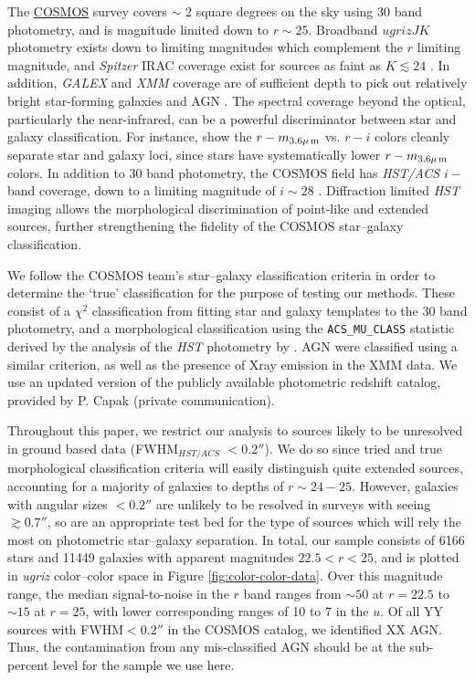\documentclass[12pt,preprint]{aastex}
\begin{document}
The \href{http://cosmos.astro.caltech.edu/}{COSMOS} survey \citep{scoville07a} covers $\sim$ 2 square degrees on
the sky using 30 band photometry, and is magnitude limited down to $r
\sim 25$.  Broadband $ugrizJK$ photometry exists down to limiting
magnitudes which complement the $r$ limiting magnitude, and {\it
  Spitzer} IRAC coverage exist for sources as faint as $K\lesssim24$ 
  \citep{capak07,sanders07,taniguchi07}.
In addition, {\it GALEX} and {\it XMM} coverage are of sufficient
depth to pick out relatively bright star-forming galaxies and AGN 
\citep{hasinger07,zamojski07}.
The spectral coverage beyond the optical, particularly the
near-infrared, can be a powerful discriminator between star and
galaxy classification.  For instance, \citet{ilbert09} show the
$r-m_{\rm 3.6\mu\,m}$ vs. $r-i$ colors cleanly separate star and
galaxy loci, since stars have systematically lower $r-m_{\rm
  3.6\mu\,m}$ colors.  In addition to 30 band photometry, the COSMOS
field has \textit{HST/ACS} $i-$band coverage, down to a limiting
magnitude of $i\sim28$ \citep{koekemoer07,scoville07b}.  Diffraction
limited \textit{HST} imaging allows the morphological discrimination
of point-like and extended sources, further strengthening the fidelity
of the COSMOS star--galaxy classification.

We follow the COSMOS team's star--galaxy classification criteria 
in order to determine the `true' classification for the purpose of 
testing our methods.  These consist of a $\chi^2$ classification 
from fitting star and galaxy templates to the 30 band photometry, 
and a morphological classification using the 
{\tt ACS\_MU\_CLASS} statistic derived by the analysis of the 
\textit{HST} photometry by \citet{scarlata07}.  AGN were classified 
using a similar criterion, as well as the presence of Xray emission 
in the {XMM} data.  We use an updated version of the publicly 
available photometric redshift catalog, provided by P. Capak 
(private communication).  

Throughout this paper, we restrict our analysis to sources likely to
be unresolved in ground based data (FWHM$_{HST/ACS}$ $< 0.2''$).  We
do so since tried and true morphological classification criteria will
easily distinguish quite extended sources, accounting for a majority
of galaxies to depths of $r\sim24-25$.  However, galaxies with angular
sizes $< 0.2''$ are unlikely to be resolved in surveys with seeing
$\gtrsim0.7''$, so are an appropriate test bed for the type of sources
which will rely the most on photometric star--galaxy separation.  In
total, our sample consists of 6166 stars and 11449 galaxies with apparent 
magnitudes $22.5<r<25$, and is plotted in {\it ugriz} color--color space in
Figure \ref{fig:color-color-data}.   Over this magnitude range, the median 
signal-to-noise in the $r$ band ranges from $\sim50$ at $r=22.5$ to 
$\sim15$ at $r=25$, with lower corresponding ranges of 10 to 7 in the $u$.  
Of all YY sources with FWHM$<0.2''$ in the COSMOS catalog, we 
identified XX AGN.  Thus, the contamination from any mis-classified AGN 
should be at the sub-percent level for the sample we use here.
\end{document}
